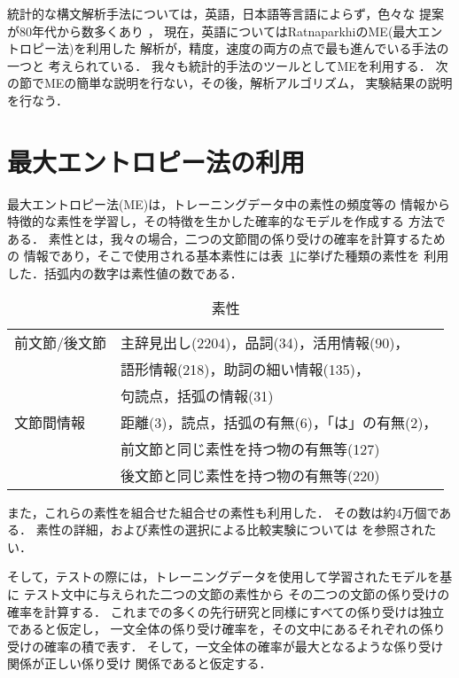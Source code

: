 統計的な構文解析手法については，英語，日本語等言語によらず，色々な
提案が80年代から数多くあり
\cite{fujisaki:coling84} \cite{magerman:acl95} \cite{sekine:iwpt95} 
\cite{collins:acl97} \cite{ratnaparkhi:emnlp97}
\cite{shirai:emnlp98} \cite{fujio:emnlp98}
\cite{sekine:nlprs97}  \cite{haruno:nlpsympo97}  \cite{ehara:nlp98}，
現在，英語についてはRatnaparkhiのME(最大エントロピー法)を利用した
解析が，精度，速度の両方の点で最も進んでいる手法の一つと
考えられている．
我々も統計的手法のツールとしてMEを利用する．
次の節でMEの簡単な説明を行ない，その後，解析アルゴリズム，
実験結果の説明を行なう．

\section{最大エントロピー法の利用}

最大エントロピー法(ME)は，トレーニングデータ中の素性の頻度等の
情報から特徴的な素性を学習し，その特徴を生かした確率的なモデルを作成する
方法である．
素性とは，我々の場合，二つの文節間の係り受けの確率を計算するための
情報であり，そこで使用される基本素性には表~\ref{素性}に挙げた種類の素性を
利用した．括弧内の数字は素性値の数である．
\begin{table}[tbh]
\begin{center}
\caption{素性}
\label{素性} 
\begin{tabular}{|l|l|}
\hline
前文節/後文節 & 主辞見出し(2204)，品詞(34)，活用情報(90)，\\
              & 語形情報(218)，助詞の細い情報(135)，      \\
              & 句読点，括弧の情報(31)                    \\
\hline
文節間情報    & 距離(3)，読点，括弧の有無(6)，「は」の有無(2)，\\
              & 前文節と同じ素性を持つ物の有無等(127) \\
              & 後文節と同じ素性を持つ物の有無等(220) \\
\hline
\end{tabular}
\end{center}
\end{table}
また，これらの素性を組合せた組合せの素性も利用した．
その数は約4万個である．
素性の詳細，および素性の選択による比較実験については
\cite{uchimoto:nlken98}を参照されたい．

そして，テストの際には，トレーニングデータを使用して学習されたモデルを基に
テスト文中に与えられた二つの文節の素性から
その二つの文節の係り受けの確率を計算する．
これまでの多くの先行研究と同様にすべての係り受けは独立であると仮定し，
一文全体の係り受け確率を，その文中にあるそれぞれの係り受けの確率の積で表す．
そして，一文全体の確率が最大となるような係り受け関係が正しい係り受け
関係であると仮定する．

